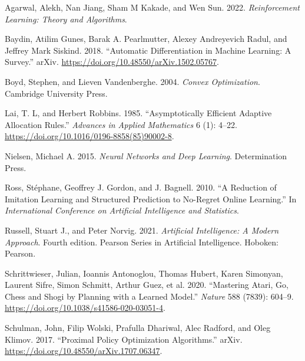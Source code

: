 \documentclass[
  letterpaper,
  DIV=11,
  numbers=noendperiod]{scrreprt}
\newlength{\cslhangindent}
\newenvironment{CSLReferences}[2] %
 {\begin{list}{}{%
  \setlength{\itemindent}{0pt}
  \setlength{\leftmargin}{0pt}
  \setlength{\parsep}{0pt}
  \ifodd #1
   \setlength{\leftmargin}{\cslhangindent}
   \setlength{\itemindent}{-1\cslhangindent}
  \fi
  \setlength{\itemsep}{#2\baselineskip}}}
 {\end{list}}
\theoremstyle{plain}
\theoremstyle{plain}
\theoremstyle{definition}
\theoremstyle{definition}
\theoremstyle{remark}
\begin{document}

\label{refs}
\begin{CSLReferences}{1}{0}
Agarwal, Alekh, Nan Jiang, Sham M Kakade, and Wen Sun. 2022.
\emph{Reinforcement {Learning}: {Theory} and {Algorithms}}.

Baydin, Atilim Gunes, Barak A. Pearlmutter, Alexey Andreyevich Radul,
and Jeffrey Mark Siskind. 2018. {``Automatic Differentiation in Machine
Learning: A Survey.''} arXiv.
\url{https://doi.org/10.48550/arXiv.1502.05767}.

Boyd, Stephen, and Lieven Vandenberghe. 2004. \emph{Convex
{Optimization}}. Cambridge University Press.

Lai, T. L, and Herbert Robbins. 1985. {``Asymptotically Efficient
Adaptive Allocation Rules.''} \emph{Advances in Applied Mathematics} 6
(1): 4--22. \url{https://doi.org/10.1016/0196-8858(85)90002-8}.

Nielsen, Michael A. 2015. \emph{Neural {Networks} and {Deep Learning}}.
Determination Press.

Ross, Stéphane, Geoffrey J. Gordon, and J. Bagnell. 2010. {``A
{Reduction} of {Imitation Learning} and {Structured Prediction} to
{No-Regret Online Learning}.''} In \emph{International {Conference} on
{Artificial Intelligence} and {Statistics}}.

Russell, Stuart J., and Peter Norvig. 2021. \emph{Artificial
Intelligence: A Modern Approach}. Fourth edition. Pearson Series in
Artificial Intelligence. Hoboken: Pearson.

Schrittwieser, Julian, Ioannis Antonoglou, Thomas Hubert, Karen
Simonyan, Laurent Sifre, Simon Schmitt, Arthur Guez, et al. 2020.
{``Mastering {Atari}, {Go}, Chess and Shogi by Planning with a Learned
Model.''} \emph{Nature} 588 (7839): 604--9.
\url{https://doi.org/10.1038/s41586-020-03051-4}.

Schulman, John, Filip Wolski, Prafulla Dhariwal, Alec Radford, and Oleg
Klimov. 2017. {``Proximal {Policy Optimization Algorithms}.''} arXiv.
\url{https://doi.org/10.48550/arXiv.1707.06347}.


\end{CSLReferences}
\end{document}
